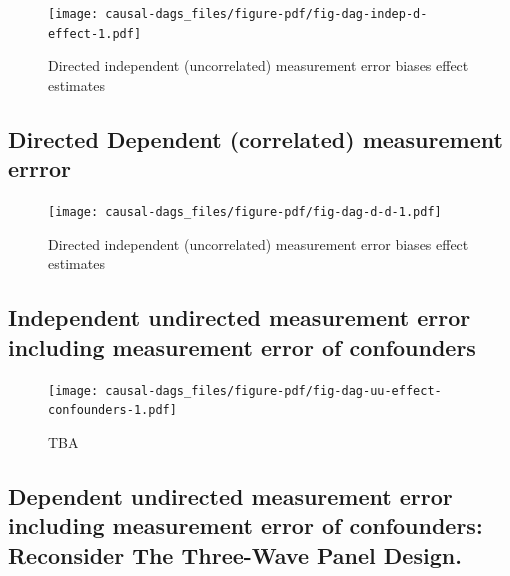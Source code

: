 \documentclass[
  singlecolumn]{report}
\begin{document}
\begin{figure}

{\centering \texttt{[image: causal-dags\_files/figure-pdf/fig-dag-indep-d-effect-1.pdf]}

}

\caption{\label{fig-dag-indep-d-effect}Directed independent
(uncorrelated) measurement error biases effect estimates}

\end{figure}

\hypertarget{directed-dependent-correlated-measurement-errror}{%
\subsection{Directed Dependent (correlated) measurement
errror}\label{directed-dependent-correlated-measurement-errror}}

\begin{figure}

{\centering \texttt{[image: causal-dags\_files/figure-pdf/fig-dag-d-d-1.pdf]}

}

\caption{\label{fig-dag-d-d}Directed independent (uncorrelated)
measurement error biases effect estimates}

\end{figure}

\hypertarget{independent-undirected-measurement-error-including-measurement-error-of-confounders}{%
\subsection{Independent undirected measurement error including
measurement error of
confounders}\label{independent-undirected-measurement-error-including-measurement-error-of-confounders}}

\begin{figure}

{\centering \texttt{[image: causal-dags\_files/figure-pdf/fig-dag-uu-effect-confounders-1.pdf]}

}

\caption{\label{fig-dag-uu-effect-confounders}TBA}

\end{figure}

\hypertarget{dependent-undirected-measurement-error-including-measurement-error-of-confounders-reconsider-the-three-wave-panel-design.}{%
\subsection{Dependent undirected measurement error including measurement
error of confounders: Reconsider The Three-Wave Panel
Design.}\label{dependent-undirected-measurement-error-including-measurement-error-of-confounders-reconsider-the-three-wave-panel-design.}}
\end{document}
